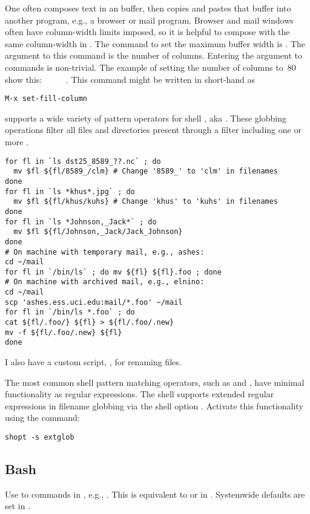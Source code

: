 \documentclass[12pt,twoside]{article}
\begin{document}
One often composes text in an  buffer, then copies and
pastes that buffer into another program, e.g., a browser or mail
program.
Browser and mail windows often have column-width limits imposed, so it
is helpful to compose with the same column-width in .
The command to set the maximum buffer width is
. 
The argument to this command is the number of columns.
Entering the argument to  commands is non-trivial.
The example of setting the number of columns to~80 show this:
~~~~~.
This command might be written in  short-hand as
\begin{verbatim}
M-x set-fill-column
\end{verbatim}

 supports a wide variety of pattern operators for 
shell , aka .
These globbing operations filter all files and directories present
through a filter including one or more .
\begin{verbatim}
for fl in `ls dst25_8589_??.nc` ; do
  mv $fl ${fl/8589_/clm} # Change '8589_' to 'clm' in filenames
done
for fl in `ls *khus*.jpg` ; do
  mv $fl ${fl/khus/kuhs} # Change 'khus' to 'kuhs' in filenames
done
for fl in `ls *Johnson,_Jack*` ; do
  mv $fl ${fl/Johnson,_Jack/Jack_Johnson}
done
# On machine with temporary mail, e.g., ashes:
cd ~/mail
for fl in `/bin/ls` ; do mv ${fl} ${fl}.foo ; done
# On machine with archived mail, e.g., elnino:
cd ~/mail
scp 'ashes.ess.uci.edu:mail/*.foo' ~/mail
for fl in `/bin/ls *.foo` ; do 
cat ${fl/.foo/} ${fl} > ${fl/.foo/.new}
mv -f ${fl/.foo/.new} ${fl}
done
\end{verbatim}
I also have a custom  script, , for
renaming files.

The most common shell pattern matching operators, such as \kbdidx{*}
and , have minimal functionality as regular expressions.
The  shell supports extended regular expressions in
filename globbing via the shell option .
Activate this functionality using the  command:
\begin{verbatim}
shopt -s extglob
\end{verbatim}

\subsection{Bash}\label{sxn:bash}
Use  to  commands in , e.g.,   
.
This is equivalent to  or  in
. 
Systemwide defaults are set in .
\end{document}
